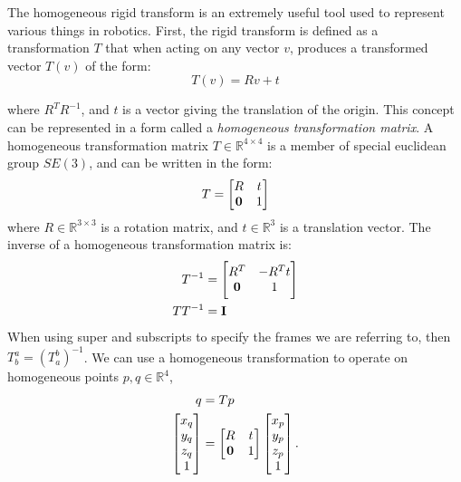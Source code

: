 The homogeneous rigid transform is an extremely useful tool used to represent various things in robotics. 
First, the rigid transform is defined as a transformation $T$ that when acting on any vector $v$, produces a transformed vector $T(v)$ of the form: 
\begin{equation}
	T(v) = R v + t
\end{equation}

where $R^T R^{-1}$, and $t$ is a vector giving the translation of the origin. 
This concept can be represented in a form called a {\it homogeneous transformation matrix}. 
A homogeneous transformation matrix $T \in \mathbb{R}^{4 \times 4}$ is a member of special euclidean group $SE(3)$, and can be written in the form:
\begin{equation}
	T = \begin{bmatrix}
		R & t \\
		\bf{0} & 1
	\end{bmatrix}
\end{equation}
where $R \in \mathbb{R}^{3 \times 3}$ is a rotation matrix, and $t \in \mathbb{R}^3$ is a translation vector. 
The inverse of a homogeneous transformation matrix is:
\begin{align}
	T^{-1} &= 
	\begin{bmatrix}
		R^T & -R^Tt \\
		\bf{0} & 1
	\end{bmatrix} \\
	T T^{-1} &= \bf{I}
\end{align}
When using super and subscripts to specify the frames we are referring to, then $T_b^a = (T_a^b)^{-1}$.
We can use a homogeneous transformation to operate on homogeneous points $p, q \in \mathbb{R}^4$, 
\begin{align}
	q &= Tp \\
	\begin{bmatrix} 
		x_q \\ 
		y_q \\
		z_q \\
		1
	\end{bmatrix}
	&= \begin{bmatrix}
		R & t \\
		\bf{0} & 1
	\end{bmatrix} 
	\begin{bmatrix}
		x_p \\
		y_p \\
		z_p \\
		1
	\end{bmatrix}.
\end{align}

